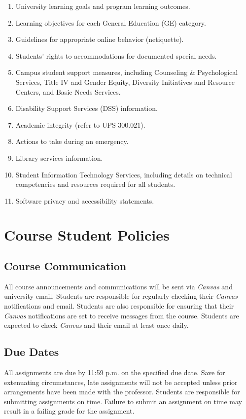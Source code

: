 \documentclass[12pt, letterpaper]{article}
\begin{document}
\begin{enumerate}
    \item   University learning goals and program learning outcomes.
    \item	Learning objectives for each General Education (GE) category.
    \item	Guidelines for appropriate online behavior (netiquette).
    \item	Students' rights to accommodations for documented special needs.
    \item   Campus student support measures, including Counseling \& Psychological Services, Title IV and Gender Equity, Diversity Initiatives and Resource Centers, and Basic Needs Services.
    \item   Disability Support Services (DSS) information.
    \item	Academic integrity (refer to UPS 300.021).
    \item	Actions to take during an emergency.
    \item	Library services information.
    \item	Student Information Technology Services, including details on technical competencies and resources required for all students.
    \item	Software privacy and accessibility statements.
\end{enumerate}

\section{Course Student Policies}

\subsection*{Course Communication}
All course announcements and communications will be sent via \emph{Canvas} and university email. Students are responsible for regularly checking their \emph{Canvas} notifications and email. Students are also responsible for ensuring that their \emph{Canvas} notifications are set to receive messages from the course. Students are expected to check \emph{Canvas} and their email at least once daily.

\subsection*{Due Dates}
All assignments are due by 11:59 p.m. on the specified due date. Save for extenuating circumstances, late assignments will not be accepted unless prior arrangements have been made with the professor. Students are responsible for submitting assignments on time. Failure to submit an assignment on time may result in a failing grade for the assignment. 
\end{document}
